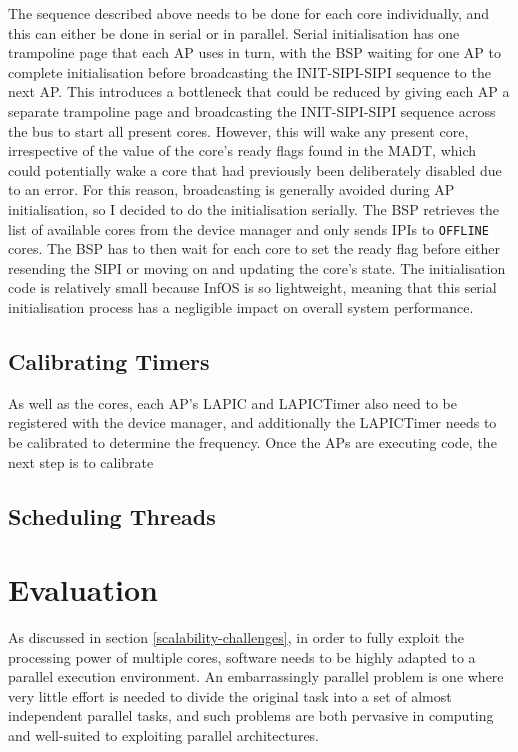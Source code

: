 \documentclass[bsc,frontabs,singlespacing,parskip,deptreport]{infthesis}     %
\begin{document}
The sequence described above needs to be done for each core individually, and this can either be done in serial or in parallel. Serial initialisation has one trampoline page that each AP uses in turn, with the BSP waiting for one AP to complete initialisation before broadcasting the INIT-SIPI-SIPI sequence to the next AP. This introduces a bottleneck that could be reduced by giving each AP a separate trampoline page and broadcasting the INIT-SIPI-SIPI sequence across the bus to start all present cores. However, this will wake any present core, irrespective of the value of the core's ready flags found in the MADT, which could potentially wake a core that had previously been deliberately disabled due to an error. For this reason, broadcasting is generally avoided during AP initialisation, so I decided to do the initialisation serially. The BSP retrieves the list of available cores from the device manager and only sends IPIs to \verb|OFFLINE| cores. The BSP has to then wait for each core to set the ready flag before either resending the SIPI or moving on and updating the core's state. The initialisation code is relatively small because InfOS is so lightweight, meaning that this serial initialisation process has a negligible impact on overall system performance.

\section{Calibrating Timers} \label{calibrating-timers}
As well as the cores, each AP's LAPIC and LAPICTimer also need to be registered with the device manager, and additionally the LAPICTimer needs to be calibrated to determine the frequency.
Once the APs are executing code, the next step is to calibrate 

\section{Scheduling Threads} \label{scheduling-threads}


\chapter{Evaluation}

As discussed in section \ref{scalability-challenges}, in order to fully exploit the processing power of multiple cores, software needs to be highly adapted to a parallel execution environment. An embarrassingly parallel problem is one where very little effort is needed to divide the original task into a set of almost independent parallel tasks, and such problems are both pervasive in computing and well-suited to exploiting parallel architectures. 
\end{document}
